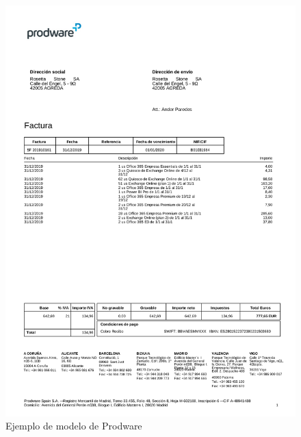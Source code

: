 \begin{figure}[hp!]
	\centering
	\includegraphics[angle=0,height=1.4\textwidth]{imaxes/z-adicional/modelo-prodware}
	\caption{Ejemplo de modelo de Prodware}
	\label{fig:modelo-prodware}
\end{figure}

